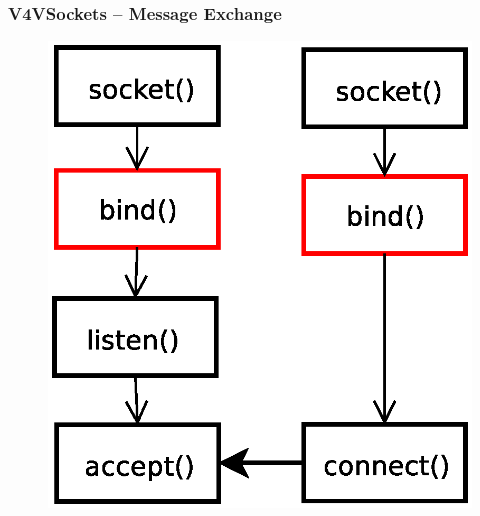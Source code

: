 \documentclass[red,slidestop,notes,compress,mathserif]{beamer}
\begin{document}
\begin{frame}
\frametitle{V4VSockets -- Message Exchange}
\begin{figure}
\includegraphics[scale=0.30]{figures/sockets4.eps}
\end{figure}
\end{frame}
\end{document}
